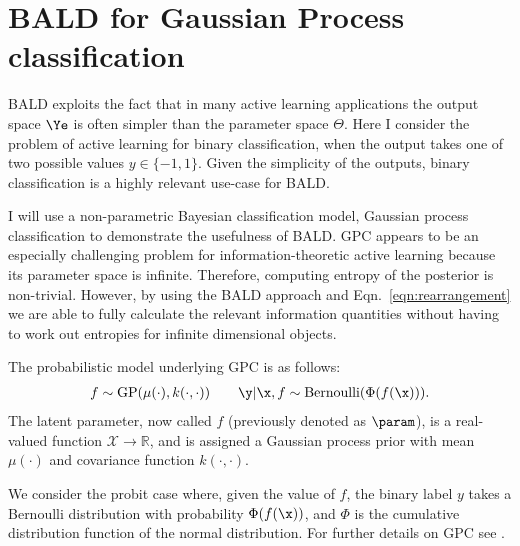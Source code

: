 
\section{BALD for Gaussian Process classification}

BALD exploits the fact that in many active learning applications the output space $\Ye$ is often simpler than the parameter space $\Theta$. Here I consider the problem of active learning for binary classification, when the output takes one of two possible values $y \in \{-1,1\}$. Given the simplicity of the outputs, binary classification is a highly relevant use-case for BALD.

I will use a non-parametric Bayesian classification model, Gaussian process classification \citep[GPC,][]{Rasmussen2006} to demonstrate the usefulness of BALD. GPC appears to be an especially challenging problem for information-theoretic active learning because its parameter space is infinite. Therefore, computing entropy of the posterior is non-trivial. However, by using the BALD approach and Eqn.\ \eqref{eqn:rearrangement} we are able to fully calculate the relevant information quantities without having to work out entropies for infinite dimensional objects. 


The probabilistic model underlying GPC is as follows:
%
\begin{align}
	f \sim \mathrm{GP}(\mu(\cdot),k(\cdot,\cdot)) \qquad \y\vert\x,f \sim\mathrm{Bernoulli}(\Phi(f(\x))). \label{eqn:GPC_model}
\end{align}
%
The latent parameter, now called $f$ (previously denoted as $\param$), is a real-valued function $\mathcal{X}\rightarrow\mathbb{R}$, and is assigned a Gaussian process prior with mean $\mu(\cdot)$ and covariance function $k(\cdot,\cdot)$.

We consider the probit case where, given the value of $f$, the binary label $y$ takes a Bernoulli distribution with probability $\Phi(f(\x))$, and $\Phi$ is the cumulative distribution function of the normal distribution. For further details on GPC see \citep{Rasmussen2006}.

